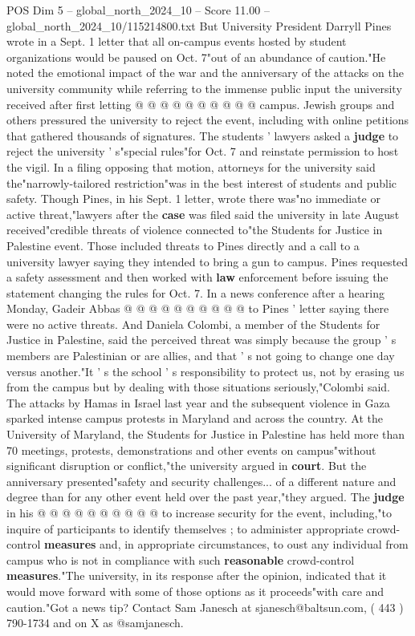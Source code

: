 \begin{textsample}{POS Dim 5 – global\_north\_2024\_10 – Score 11.00 – global\_north\_2024\_10/115214800.txt}
But University President Darryll Pines wrote in a Sept. 1 letter that all on-campus events hosted by student organizations would be paused on Oct. 7"out of an abundance of caution."He noted the emotional impact of the war and the anniversary of the attacks on the university community while referring to the immense public input the university received after first letting @ @ @ @ @ @ @ @ @ @ campus.
Jewish groups and others pressured the university to reject the event, including with online petitions that gathered thousands of signatures.
The students ' lawyers asked a \textbf{judge} to reject the university ' s"special rules"for Oct. 7 and reinstate permission to host the vigil.
In a filing opposing that motion, attorneys for the university said the"narrowly-tailored restriction"was in the best interest of students and public safety.
Though Pines, in his Sept. 1 letter, wrote there was"no immediate or active threat,"lawyers after the \textbf{case} was filed said the university in late August received"credible threats of violence connected to"the Students for Justice in Palestine event.
Those included threats to Pines directly and a call to a university lawyer saying they intended to bring a gun to campus.
Pines requested a safety assessment and then worked with \textbf{law} enforcement before issuing the statement changing the rules for Oct. 7.
In a news conference after a hearing Monday, Gadeir Abbas @ @ @ @ @ @ @ @ @ @ to Pines ' letter saying there were no active threats.
And Daniela Colombi, a member of the Students for Justice in Palestine, said the perceived threat was simply because the group ' s members are Palestinian or are allies, and that ' s not going to change one day versus another."It ' s the school ' s responsibility to protect us, not by erasing us from the campus but by dealing with those situations seriously,"Colombi said.
The attacks by Hamas in Israel last year and the subsequent violence in Gaza sparked intense campus protests in Maryland and across the country.
At the University of Maryland, the Students for Justice in Palestine has held more than 70 meetings, protests, demonstrations and other events on campus"without significant disruption or conflict,"the university argued in \textbf{court}.
But the anniversary presented"safety and security challenges... of a different nature and degree than for any other event held over the past year,"they argued.
The \textbf{judge} in his @ @ @ @ @ @ @ @ @ @ to increase security for the event, including,"to inquire of participants to identify themselves ; to administer appropriate crowd-control \textbf{measures} and, in appropriate circumstances, to oust any individual from campus who is not in compliance with such \textbf{reasonable} crowd-control \textbf{measures}."The university, in its response after the opinion, indicated that it would move forward with some of those options as it proceeds"with care and caution."Got a news tip?
Contact Sam Janesch at sjanesch@baltsun.com, ( 443 ) 790-1734 and on X as @samjanesch.

\end{textsample}
